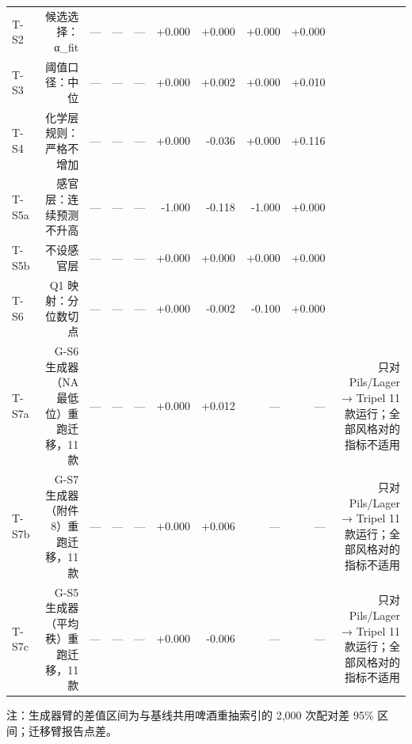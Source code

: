 \begin{table}[htbp]
{\begin{tabular}{lrrrrrrrrr}
T-S2 & 候选选择：α\_fit & — & — & — & +0.000 & +0.000 & +0.000 & +0.000 &  \\
T-S3 & 阈值口径：中位 & — & — & — & +0.000 & +0.002 & +0.000 & +0.010 &  \\
T-S4 & 化学层规则：严格不增加 & — & — & — & +0.000 & -0.036 & +0.000 & +0.116 &  \\
T-S5a & 感官层：连续预测不升高 & — & — & — & -1.000 & -0.118 & -1.000 & +0.000 &  \\
T-S5b & 不设感官层 & — & — & — & +0.000 & +0.000 & +0.000 & +0.000 &  \\
T-S6 & Q1 映射：分位数切点 & — & — & — & +0.000 & -0.002 & -0.100 & +0.000 &  \\
T-S7a & G-S6 生成器（NA 最低位）重跑迁移，11 款 & — & — & — & +0.000 & +0.012 & — & — & 只对 Pils/Lager → Tripel 11 款运行；全部风格对的指标不适用 \\
T-S7b & G-S7 生成器（附件 8）重跑迁移，11 款 & — & — & — & +0.000 & +0.006 & — & — & 只对 Pils/Lager → Tripel 11 款运行；全部风格对的指标不适用 \\
T-S7c & G-S5 生成器（平均秩）重跑迁移，11 款 & — & — & — & +0.000 & -0.006 & — & — & 只对 Pils/Lager → Tripel 11 款运行；全部风格对的指标不适用 \\
\hline
\end{tabular}}
\par\footnotesize 注：生成器臂的差值区间为与基线共用啤酒重抽索引的 2,000 次配对差 95\% 区间；迁移臂报告点差。
\end{table}
